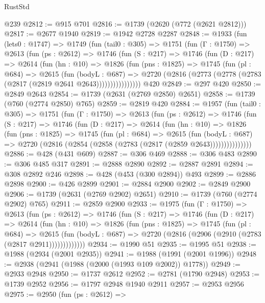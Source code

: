 \begin{lexlean}{RustStd}
\begin{coremodule}
    @239
@2812 := @915 @701
@2816 := @1739 (@2620 (@772 (@2621 @2812)))
@2817 := @2677 @1940
@2819 := @1942 @2728 @2287
@2848 := @1933
    (fun (lets0 : @1747) =>
    @1749
      (fun (tail0 : @305) =>
      @1751
        (fun (Γ : @1750) =>
        @2613
          (fun (ps : @2612) =>
          @1746
            (fun (S : @217) =>
            @1746
              (fun (D : @217) =>
              @2614
                (fun (hn : @10) =>
                @1826
                  (fun (pns : @1825) =>
                  @1745
                    (fun (pl : @684) =>
                    @2615
                      (fun (bodyL : @687) =>
                      @2720 (@2816 (@2773 (@2778 (@2783 (@2817 (@2819 @2641 @2643))))))))))))))))
    @420
@2849 := @297 @420
@2850 := @2849 @2643
@2854 := @1739 (@2631 (@2769 @2850) @2651)
@2858 := @1739 (@760 (@2774 @2850) @765)
@2859 := @2819 @420
@2884 := @1957
    (fun (tail0 : @305) =>
    @1751
      (fun (Γ : @1750) =>
      @2613
        (fun (ps : @2612) =>
        @1746
          (fun (S : @217) =>
          @1746
            (fun (D : @217) =>
            @2614
              (fun (hn : @10) =>
              @1826
                (fun (pns : @1825) =>
                @1745
                  (fun (pl : @684) =>
                  @2615
                    (fun (bodyL : @687) =>
                    @2720 (@2816 (@2854 (@2858 (@2783 (@2817 (@2859 @2643)))))))))))))))
@2886 := @428 (@431 @609)
@2887 := @306 @469
@2888 := @306 @483
@2890 := @306 @485 @317
@2891 := @2888 @2890
@2892 := @2887 @2891
@2894 := @308 @2892 @246
@2898 := @428 (@453 (@300 @2894)) @493
@2899 := @2886 @2898
@2900 := @426 @2899
@2901 := @2884 @2900
@2902 := @2849 @2900
@2906 := @1739 (@2631 (@2769 @2902) @2651)
@2910 := @1739 (@760 (@2774 @2902) @765)
@2911 := @2859 @2900
@2933 := @1975
    (fun (Γ : @1750) =>
    @2613
      (fun (ps : @2612) =>
      @1746
        (fun (S : @217) =>
        @1746
          (fun (D : @217) =>
          @2614
            (fun (hn : @10) =>
            @1826
              (fun (pns : @1825) =>
              @1745
                (fun (pl : @684) =>
                @2615
                  (fun (bodyL : @687) => @2720 (@2816 (@2906 (@2910 (@2783 (@2817 @2911)))))))))))))
@2934 := @1990 @51
@2935 := @1995 @51
@2938 := @1988 (@2934 (@2001 @2935))
@2941 := @1988 (@1991 (@2001 @1996))
@2948 := @2938 (@2941 (@1988 (@2000 (@1993 @109 @2002)) @1778))
@2949 := @2933 @2948
@2950 := @1737 @2612
@2952 := @2781 (@1790 @2948)
@2953 := @1739 @2952
@2956 := @1797 @2948 @1940 @2911
@2957 := @2953 @2956
@2975 := @2950
    (fun (ps : @2612) =>

\end{coremodule}
\end{lexlean}
